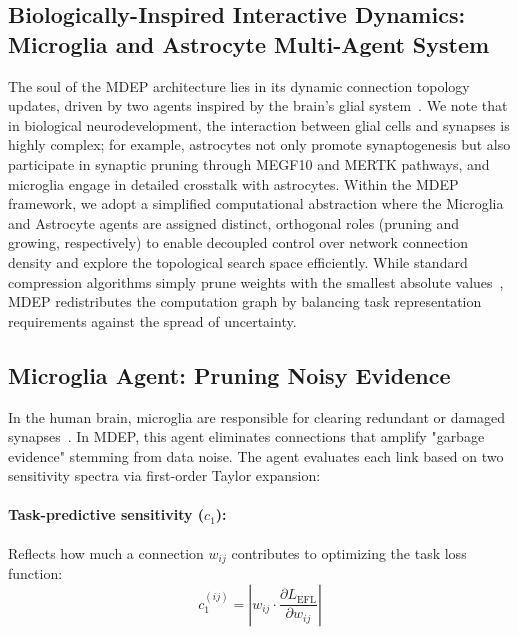 \documentclass[letterpaper]{article} %
\begin{document}
\subsection{Biologically-Inspired Interactive Dynamics: Microglia and Astrocyte Multi-Agent System}\label{sec:agents}

The soul of the MDEP architecture lies in its dynamic connection topology updates, driven by two agents inspired by the brain's glial system~\cite{paolicelli2011synaptic, schafer2012microglia}. We note that in biological neurodevelopment, the interaction between glial cells and synapses is highly complex; for example, astrocytes not only promote synaptogenesis but also participate in synaptic pruning through MEGF10 and MERTK pathways, and microglia engage in detailed crosstalk with astrocytes. Within the MDEP framework, we adopt a simplified computational abstraction where the Microglia and Astrocyte agents are assigned distinct, orthogonal roles (pruning and growing, respectively) to enable decoupled control over network connection density and explore the topological search space efficiently. While standard compression algorithms simply prune weights with the smallest absolute values~\cite{han2016deep}, MDEP redistributes the computation graph by balancing task representation requirements against the spread of uncertainty.

\subsection{Microglia Agent: Pruning Noisy Evidence}\label{subsec:microglia}

In the human brain, microglia are responsible for clearing redundant or damaged synapses~\cite{paolicelli2011synaptic, schafer2012microglia}. In MDEP, this agent eliminates connections that amplify "garbage evidence" stemming from data noise. The agent evaluates each link based on two sensitivity spectra via first-order Taylor expansion:

\paragraph{Task-predictive sensitivity ($c_1$):}
Reflects how much a connection $w_{ij}$ contributes to optimizing the task loss function:
\begin{equation}
    c_1^{(ij)} = \left| w_{ij} \cdot \frac{\partial L_{\text{EFL}}}{\partial w_{ij}} \right|
\end{equation}
\end{document}
